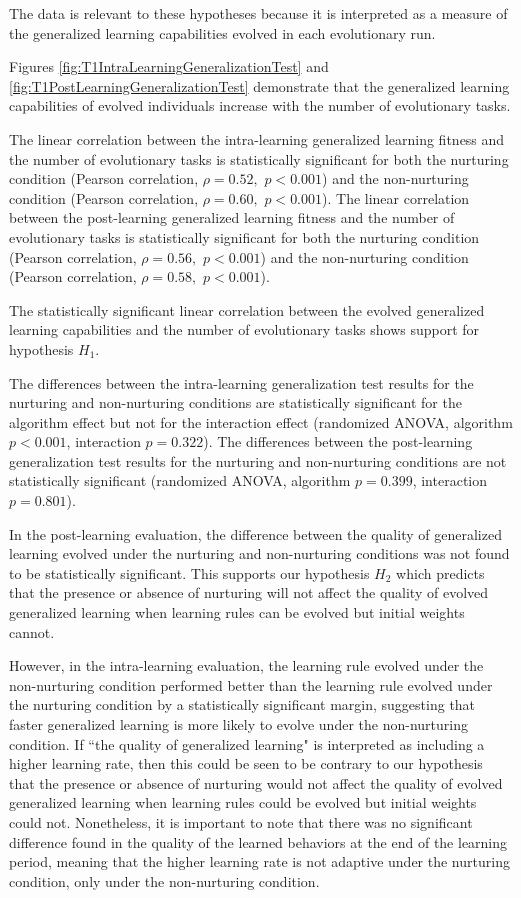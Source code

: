 \documentclass[master]{outhesis}
\begin{document}
The data is relevant to these hypotheses because it is interpreted as a measure of the generalized learning capabilities evolved in each evolutionary run.

Figures \ref{fig:T1IntraLearningGeneralizationTest} and \ref{fig:T1PostLearningGeneralizationTest} demonstrate that the generalized learning capabilities of evolved individuals increase with the number of evolutionary tasks.

The linear correlation between the intra-learning generalized learning fitness and the number of evolutionary tasks is statistically significant for both
the nurturing condition (Pearson correlation, $\rho=0.52,$ $p < 0.001$)
and the non-nurturing condition (Pearson correlation, $\rho=0.60,$ $p < 0.001$).
The linear correlation between the post-learning generalized learning fitness and the number of evolutionary tasks is statistically significant for both
the nurturing condition (Pearson correlation, $\rho=0.56,$ $p < 0.001$)
and the non-nurturing condition (Pearson correlation, $\rho=0.58,$ $p < 0.001$).

The statistically significant linear correlation between the evolved generalized learning capabilities and the number of evolutionary tasks shows support for hypothesis $H_1$.

The differences between the intra-learning generalization test results for the nurturing and non-nurturing conditions are statistically significant for the algorithm effect but not for the interaction effect (randomized ANOVA, algorithm $p < 0.001$, interaction $p = 0.322$).
The differences between the post-learning generalization test results for the nurturing and non-nurturing conditions are not statistically significant (randomized ANOVA, algorithm $p = 0.399$, interaction $p = 0.801$).

In the post-learning evaluation,
the difference between the quality of generalized learning evolved under the nurturing and non-nurturing conditions was not found to be statistically significant.
This supports our hypothesis $H_2$ which predicts that the presence or absence of nurturing will not affect the quality of evolved generalized learning when learning rules can be evolved but initial weights cannot. 

However,
in the intra-learning evaluation,
the learning rule evolved under the non-nurturing condition performed better than the learning rule evolved under the nurturing condition by a statistically significant margin,
suggesting that faster generalized learning is more likely to evolve under the non-nurturing condition.
If ``the quality of generalized learning" is interpreted as including a higher learning rate,
then this could be seen to be contrary to our hypothesis that the presence or absence of nurturing would not affect the quality of evolved generalized learning 
when learning rules could be evolved but initial weights could not.
Nonetheless,
it is important to note that there was no significant difference found in the quality of the learned behaviors at the end of the learning period,
meaning that the higher learning rate is not adaptive under the nurturing condition,
only under the non-nurturing condition.
\end{document}

